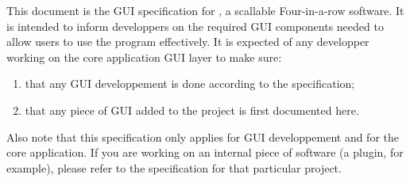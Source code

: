 This document is the GUI specification for , a scallable
Four-in-a-row software. It is intended to inform developpers on the required
GUI components needed to allow users to use the program effectively. It is
expected of any developper working on the core  application
GUI layer to make sure:

\begin{enumerate}
    \item that any GUI developpement is done according to the specification;
    \item that any piece of GUI added to the project is first documented here.
\end{enumerate}

Also note that this specification only applies for GUI developpement and for
the core  application. If you are working on an internal piece
of software (a plugin, for example), please refer to the specification for that
particular project.

